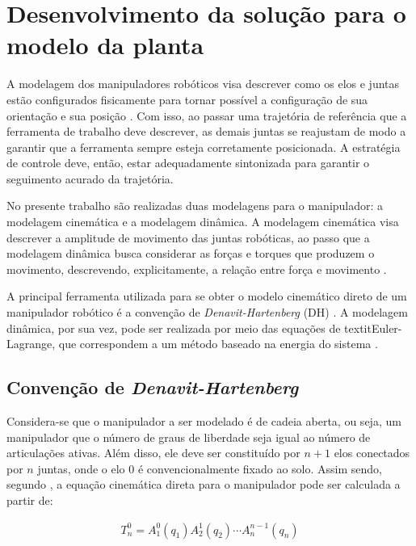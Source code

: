 \section{Desenvolvimento da solução para o modelo da planta}
\label{metodo}

A modelagem dos manipuladores robóticos visa descrever como os elos e juntas estão 
configurados fisicamente para tornar possível a configuração de sua orientação e sua posição 
\cite{paul1981robot}. Com isso, ao passar uma trajetória de referência que a 
ferramenta de trabalho deve descrever, as demais juntas se reajustam de modo a garantir 
que a ferramenta sempre esteja corretamente posicionada. A estratégia de controle deve, 
então, estar adequadamente sintonizada para garantir o seguimento acurado da trajetória.

No presente trabalho são realizadas duas modelagens para o manipulador: a modelagem 
cinemática e a modelagem dinâmica. A modelagem cinemática visa descrever a amplitude 
de movimento das juntas robóticas, ao passo que a modelagem dinâmica busca considerar 
as forças e torques que produzem o movimento, descrevendo, explicitamente, a relação 
entre força e movimento \cite{Spong}.

A principal ferramenta utilizada para se obter o modelo cinemático direto de um 
manipulador robótico é a convenção de \textit{Denavit-Hartenberg} (DH) \cite{paul1981robot}
. A modelagem dinâmica, por sua vez, pode ser realizada por meio das equações de 
textit{Euler-Lagrange}, que correspondem a um método baseado na energia do sistema 
\cite{Park}.

\subsection{Convenção de \textit{Denavit-Hartenberg}}
\label{DH}

Considera-se que o manipulador a ser modelado é de cadeia aberta, ou seja, um manipulador 
que o número de graus de liberdade seja igual ao número de articulações ativas.
Além disso, ele deve ser constituído por $n+1$ elos conectados por $n$ juntas, onde 
o elo $0$ é convencionalmente fixado ao solo. Assim sendo, segundo , 
a equação cinemática direta para o manipulador pode ser calculada a partir de:

\begin{equation}
  \begin{gathered}
    T^0_n = A^0_1(q_1)A^1_2(q_2)\cdots A^{n-1}_n(q_n)
  \end{gathered}
  \label{eq:cinematicaDireta}
\end{equation}

